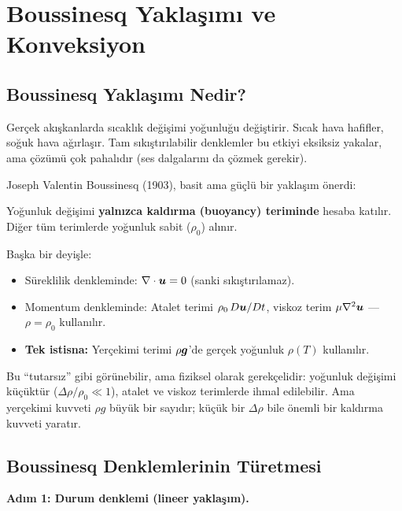 \chapter{Boussinesq Yaklaşımı ve Konveksiyon}
\label{ch:boussinesq}

\section{Boussinesq Yaklaşımı Nedir?}
\label{sec:boussinesq_nedir}

Gerçek akışkanlarda sıcaklık değişimi yoğunluğu değiştirir. Sıcak hava hafifler, soğuk hava ağırlaşır. Tam sıkıştırılabilir denklemler bu etkiyi eksiksiz yakalar, ama çözümü çok pahalıdır (ses dalgalarını da çözmek gerekir).

Joseph Valentin Boussinesq (1903), basit ama güçlü bir yaklaşım önerdi:

\begin{definition}
Yoğunluk değişimi \textbf{yalnızca kaldırma (buoyancy) teriminde} hesaba katılır. Diğer tüm terimlerde yoğunluk sabit ($\rho_0$) alınır.
\end{definition}

Başka bir deyişle:
\begin{itemize}
    \item Süreklilik denkleminde: $\nabla \cdot\bm{u} = 0$ (sanki sıkıştırılamaz).
    \item Momentum denkleminde: Atalet terimi $\rho_0\,D\bm{u}/Dt$, viskoz terim $\mu\nabla^2\bm{u}$ --- $\rho = \rho_0$ kullanılır.
    \item \textbf{Tek istisna:} Yerçekimi terimi $\rho\bm{g}$'de gerçek yoğunluk $\rho(T)$ kullanılır.
\end{itemize}

Bu ``tutarsız'' gibi görünebilir, ama fiziksel olarak gerekçelidir: yoğunluk değişimi küçüktür ($\Delta\rho/\rho_0 \ll 1$), atalet ve viskoz terimlerde ihmal edilebilir. Ama yerçekimi kuvveti $\rho g$ büyük bir sayıdır; küçük bir $\Delta\rho$ bile önemli bir kaldırma kuvveti yaratır.


\section{Boussinesq Denklemlerinin Türetmesi}
\label{sec:boussinesq_turetme}

\textbf{Adım 1: Durum denklemi (lineer yaklaşım).}

